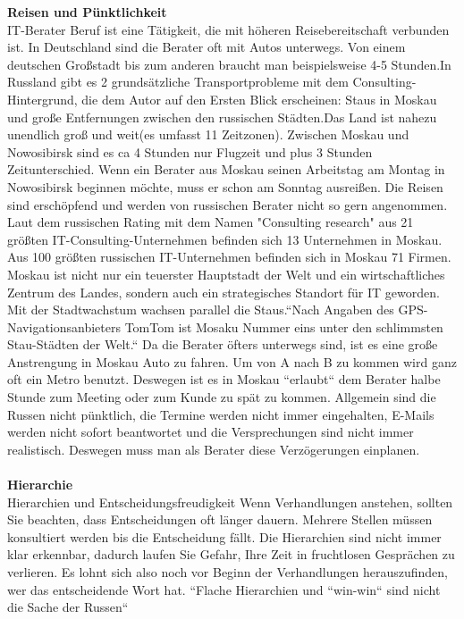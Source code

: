 	 \textbf{Reisen und Pünktlichkeit}\\
	 IT-Berater Beruf ist eine Tätigkeit, die mit höheren Reisebereitschaft verbunden ist. In Deutschland sind die Berater oft mit Autos unterwegs. Von einem deutschen Großstadt bis zum anderen braucht man beispielsweise 4-5 Stunden.In Russland gibt es 2 grundsätzliche Transportprobleme mit dem Consulting-Hintergrund, die dem Autor auf den Ersten Blick erscheinen: Staus in Moskau und große Entfernungen zwischen den russischen Städten.Das Land ist nahezu unendlich groß und weit(es umfasst 11 Zeitzonen).
	 Zwischen Moskau und Nowosibirsk sind es ca 4 Stunden nur Flugzeit und plus 3 Stunden Zeitunterschied. Wenn ein Berater aus Moskau seinen Arbeitstag am Montag in Nowosibirsk beginnen möchte, muss er schon am Sonntag ausreißen. Die Reisen sind erschöpfend und werden von russischen Berater nicht so gern angenommen.\\
	 Laut dem russischen Rating mit dem Namen "Consulting research" aus 21 größten IT-Consulting-Unternehmen befinden sich 13 Unternehmen in Moskau.%
	 Aus 100 größten russischen IT-Unternehmen befinden sich in Moskau 71 Firmen. 
	 Moskau ist nicht nur ein teuerster Hauptstadt der Welt und ein wirtschaftliches Zentrum des Landes, sondern auch ein strategisches Standort für IT geworden.
	 Mit der Stadtwachstum wachsen parallel die Staus.``Nach Angaben des GPS-Navigationsanbieters TomTom ist Mosaku Nummer eins unter den schlimmsten Stau-Städten der Welt.``%
	 Da die Berater öfters unterwegs sind, ist es eine große Anstrengung in Moskau Auto zu fahren. Um von A nach B zu kommen wird ganz oft ein Metro benutzt. 
	 Deswegen ist es in Moskau ``erlaubt`` dem Berater halbe Stunde zum Meeting oder zum  Kunde zu spät zu kommen. Allgemein sind die Russen nicht pünktlich, die Termine werden nicht immer eingehalten, E-Mails werden nicht sofort beantwortet und die Versprechungen sind nicht immer realistisch. Deswegen muss man als Berater diese Verzögerungen einplanen.%
	  \\ 
	  \\
	 	 \textbf{Hierarchie}\\
	 Hierarchien und Entscheidungsfreudigkeit
	 Wenn Verhandlungen anstehen, sollten Sie beachten, dass Entscheidungen oft länger dauern. Mehrere Stellen müssen konsultiert werden bis die Entscheidung fällt. Die Hierarchien sind nicht immer klar erkennbar, dadurch laufen Sie Gefahr, Ihre Zeit in fruchtlosen Gesprächen zu verlieren. Es lohnt sich also noch vor Beginn der Verhandlungen herauszufinden, wer das entscheidende Wort hat.
	 ``Flache Hierarchien und ``win-win`` sind nicht die Sache der Russen`` %
	 
